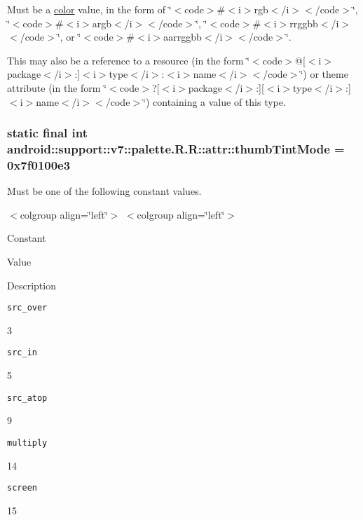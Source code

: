 Must be a \hyperlink{classandroid_1_1support_1_1v7_1_1palette_1_1_r_1_1color}{color} value, in the form of \char`\"{}$<$code$>$\#$<$i$>$rgb$<$/i$>$$<$/code$>$\char`\"{}, \char`\"{}$<$code$>$\#$<$i$>$argb$<$/i$>$$<$/code$>$\char`\"{}, \char`\"{}$<$code$>$\#$<$i$>$rrggbb$<$/i$>$$<$/code$>$\char`\"{}, or \char`\"{}$<$code$>$\#$<$i$>$aarrggbb$<$/i$>$$<$/code$>$\char`\"{}. 

This may also be a reference to a resource (in the form \char`\"{}$<$code$>$@\mbox{[}$<$i$>$package$<$/i$>$:\mbox{]}$<$i$>$type$<$/i$>$:$<$i$>$name$<$/i$>$$<$/code$>$\char`\"{}) or theme attribute (in the form \char`\"{}$<$code$>$?\mbox{[}$<$i$>$package$<$/i$>$:\mbox{]}\mbox{[}$<$i$>$type$<$/i$>$:\mbox{]}$<$i$>$name$<$/i$>$$<$/code$>$\char`\"{}) containing a value of this type. \hypertarget{classandroid_1_1support_1_1v7_1_1palette_1_1_r_1_1attr_bc38e4af333f56fffc00852dc27c895c}{
\subsubsection[{thumbTintMode}]{\setlength{\rightskip}{0pt plus 5cm}static final int android::support::v7::palette.R.R::attr::thumbTintMode = 0x7f0100e3}}
\label{classandroid_1_1support_1_1v7_1_1palette_1_1_r_1_1attr_bc38e4af333f56fffc00852dc27c895c}


Must be one of the following constant values. \begin{TabularC}{0}
\hline
\end{TabularC}
$<$colgroup align=\char`\"{}left\char`\"{}$>$ $<$colgroup align=\char`\"{}left\char`\"{}$>$ 

Constant

Value

Description 

{\tt src\_\-over}

3

{\tt src\_\-in}

5

{\tt src\_\-atop}

9

{\tt multiply}

14

{\tt screen}

15

